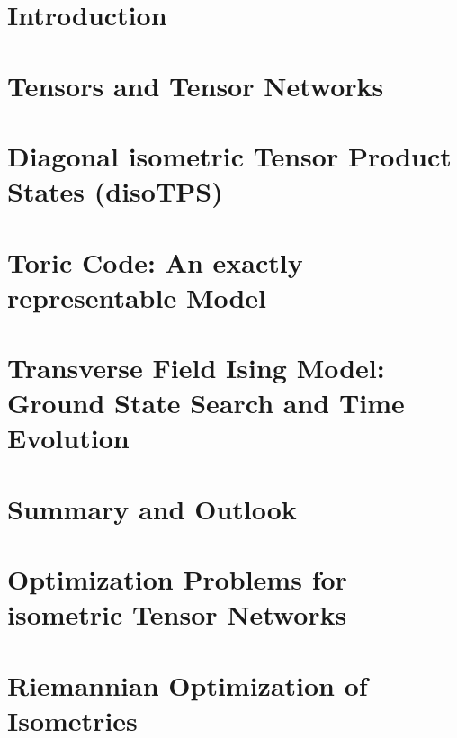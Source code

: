 \documentclass[encoding=utf8,british]{template/thesis}
\begin{document}
	\chapter{Introduction}
	\label{chap:introduction}
	
	
	\chapter{Tensors and Tensor Networks}
	\label{chap:tensors_and_tensor_networks}
	
	
	\chapter{Diagonal isometric Tensor Product States (disoTPS)}
	\label{chap:disoTPS}
	
	
	\chapter{Toric Code: An exactly representable Model}
	\label{chap:toric_code}
	
	
	\chapter{Transverse Field Ising Model: Ground State Search and Time Evolution}
	\label{chap:TFI}
	
	
	\chapter{Summary and Outlook}
	\label{chap:summary}
	
	\appendix
	
	\chapter{Optimization Problems for isometric Tensor Networks}
	\label{app:optimization_problems_for_isometric_tensor_networks}
	
	
	\chapter{Riemannian Optimization of Isometries}
	\label{app:riemannian_optimization_of_isometries}
	
	
\end{document}
